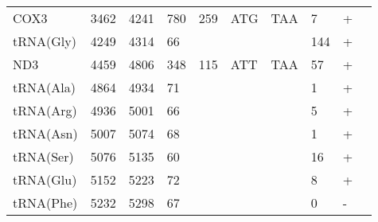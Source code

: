 \documentclass[../DISSERTACAO_MAIN.tex]{subfiles}
\begin{document}
\begin{longtable}{llllllllllllllllllllll}
			COX3         & 3462           & \multicolumn{2}{l}{4241}  & \multicolumn{2}{l}{780}        & \multicolumn{2}{l}{259}       & \multicolumn{3}{l}{ATG}                 & \multicolumn{3}{l}{TAA}   & \multicolumn{3}{l}{7}          & \multicolumn{3}{l}{+}      & \multicolumn{2}{l}{} \\
			tRNA(Gly)    & 4249           & \multicolumn{2}{l}{4314}  & \multicolumn{2}{l}{66}         & \multicolumn{2}{l}{}          & \multicolumn{3}{l}{}                    & \multicolumn{3}{l}{}      & \multicolumn{3}{l}{144}        & \multicolumn{3}{l}{+}      & \multicolumn{2}{l}{} \\
			ND3          & 4459           & \multicolumn{2}{l}{4806}  & \multicolumn{2}{l}{348}        & \multicolumn{2}{l}{115}       & \multicolumn{3}{l}{ATT}                 & \multicolumn{3}{l}{TAA}   & \multicolumn{3}{l}{57}         & \multicolumn{3}{l}{+}      & \multicolumn{2}{l}{} \\
			tRNA(Ala)    & 4864           & \multicolumn{2}{l}{4934}  & \multicolumn{2}{l}{71}         & \multicolumn{2}{l}{}          & \multicolumn{3}{l}{}                    & \multicolumn{3}{l}{}      & \multicolumn{3}{l}{1}          & \multicolumn{3}{l}{+}      & \multicolumn{2}{l}{} \\
			tRNA(Arg)    & 4936           & \multicolumn{2}{l}{5001}  & \multicolumn{2}{l}{66}         & \multicolumn{2}{l}{}          & \multicolumn{3}{l}{}                    & \multicolumn{3}{l}{}      & \multicolumn{3}{l}{5}          & \multicolumn{3}{l}{+}      & \multicolumn{2}{l}{} \\
			tRNA(Asn)    & 5007           & \multicolumn{2}{l}{5074}  & \multicolumn{2}{l}{68}         & \multicolumn{2}{l}{}          & \multicolumn{3}{l}{}                    & \multicolumn{3}{l}{}      & \multicolumn{3}{l}{1}          & \multicolumn{3}{l}{+}      & \multicolumn{2}{l}{} \\
			tRNA(Ser)    & 5076           & \multicolumn{2}{l}{5135}  & \multicolumn{2}{l}{60}         & \multicolumn{2}{l}{}          & \multicolumn{3}{l}{}                    & \multicolumn{3}{l}{}      & \multicolumn{3}{l}{16}         & \multicolumn{3}{l}{+}      & \multicolumn{2}{l}{} \\
			tRNA(Glu)    & 5152           & \multicolumn{2}{l}{5223}  & \multicolumn{2}{l}{72}         & \multicolumn{2}{l}{}          & \multicolumn{3}{l}{}                    & \multicolumn{3}{l}{}      & \multicolumn{3}{l}{8}          & \multicolumn{3}{l}{+}      & \multicolumn{2}{l}{} \\
			tRNA(Phe)    & 5232           & \multicolumn{2}{l}{5298}  & \multicolumn{2}{l}{67}         & \multicolumn{2}{l}{}          & \multicolumn{3}{l}{}                    & \multicolumn{3}{l}{}      & \multicolumn{3}{l}{0}          & \multicolumn{3}{l}{-}      & \multicolumn{2}{l}{} \\

\end{longtable}
\end{document}
